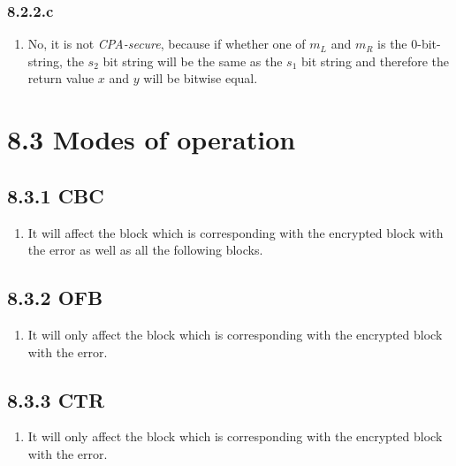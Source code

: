 \documentclass{report}
\def\apeqA{\SavedStyle\sim}
\def\apeq{\setstackgap{L}{\dimexpr.5pt+1.5\LMpt}\ensurestackMath{%
  \ThisStyle{\mathrel{\Centerstack{{\apeqA} {\apeqA} {\apeqA}}}}}}
\begin{document}
	\subsubsection*{8.2.2.c}
	\begin{enumerate}[]
		\item No, it is not \textit{CPA-secure}, because if whether one of $m_L$ and $m_R$ is the 0-bit-string, the $s_2$ bit string will be the same as the $s_1$ bit string and therefore the return value $x$ and $y$ will be bitwise equal.
	\end{enumerate}
	
	\section*{8.3 Modes of operation}
	\subsection*{8.3.1 CBC}
	\begin{enumerate}[]
		\item It will affect the block which is corresponding with the encrypted block with the error as well as all the following blocks.
	\end{enumerate}
	\subsection*{8.3.2 OFB}
	\begin{enumerate}[]
		\item It will only affect the block which is corresponding with the encrypted block with the error.
	\end{enumerate}
	\subsection*{8.3.3 CTR}
	\begin{enumerate}[]
		\item It will only affect the block which is corresponding with the encrypted block with the error.
	\end{enumerate}
	
\end{document}
